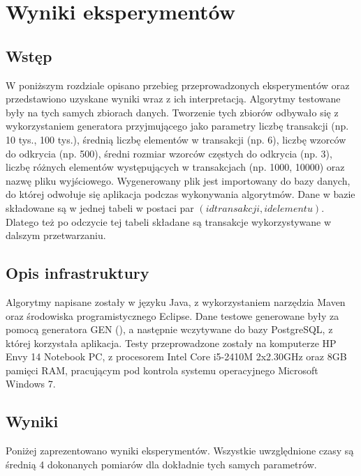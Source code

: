 \chapter{Wyniki eksperymentów}
\label{c5}

\section{Wstęp}
\label{c51}
W poniższym rozdziale opisano przebieg przeprowadzonych eksperymentów oraz przedstawiono uzyskane wyniki wraz z ich interpretacją. Algorytmy testowane były na tych samych zbiorach danych. Tworzenie tych zbiorów odbywało się z wykorzystaniem generatora przyjmującego jako parametry liczbę transakcji (np. 10 tys., 100 tys.), średnią liczbę elementów w transakcji (np. 6), liczbę wzorców do odkrycia (np. 500), średni rozmiar wzorców częstych do odkrycia (np. 3), liczbę różnych elementów występujących w transakcjach (np. 1000, 10000) oraz nazwę pliku wyjściowego. Wygenerowany plik jest importowany do bazy danych, do której odwołuje się aplikacja podczas wykonywania algorytmów. Dane w bazie składowane są w jednej tabeli w postaci par \((id transakcji, id elementu)\). Dlatego też po odczycie tej tabeli składane są transakcje wykorzystywane w dalszym przetwarzaniu. 

\section{Opis infrastruktury}
\label{c52}
Algorytmy napisane zostały w języku Java, z wykorzystaniem narzędzia Maven oraz środowiska programistycznego Eclipse. Dane testowe generowane były za pomocą generatora GEN (\cite{AgrawalGEN}), a następnie wczytywane do bazy PostgreSQL, z której korzystała aplikacja. Testy przeprowadzone zostały na komputerze HP Envy 14 Notebook PC, z procesorem Intel Core i5-2410M 2x2.30GHz oraz 8GB pamięci RAM, pracującym pod kontrola systemu operacyjnego Microsoft Windows 7. 

\section{Wyniki}
\label{c53}
Poniżej zaprezentowano wyniki eksperymentów. Wszystkie uwzględnione czasy są średnią 4 dokonanych pomiarów dla dokładnie tych samych parametrów. 

